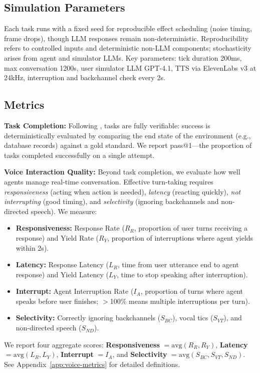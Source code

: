 \subsection{Simulation Parameters}

Each task runs with a fixed seed for reproducible effect scheduling (noise timing, frame drops), though LLM responses remain non-deterministic. Reproducibility refers to controlled inputs and deterministic non-LLM components; stochasticity arises from agent and simulator LLMs. Key parameters: tick duration 200ms, max conversation 1200s, user simulator LLM GPT-4.1, TTS via ElevenLabs v3 at 24kHz, interruption and backchannel check every 2s.

\subsection{Metrics}

\textbf{Task Completion:} Following \tautwobench{}, tasks are fully verifiable: success is deterministically evaluated by comparing the end state of the environment (e.g., database records) against a gold standard. We report pass@1---the proportion of tasks completed successfully on a single attempt.

\textbf{Voice Interaction Quality:} Beyond task completion, we evaluate how well agents manage real-time conversation. Effective turn-taking requires \textit{responsiveness} (acting when action is needed), \textit{latency} (reacting quickly), \textit{not interrupting} (good timing), and \textit{selectivity} (ignoring backchannels and non-directed speech). We measure:
\begin{itemize}[nosep,leftmargin=*]
    \item \textbf{Responsiveness:} Response Rate ($R_R$, proportion of user turns receiving a response) and Yield Rate ($R_Y$, proportion of interruptions where agent yields within 2s).
    \item \textbf{Latency:} Response Latency ($L_R$, time from user utterance end to agent response) and Yield Latency ($L_Y$, time to stop speaking after interruption).
    \item \textbf{Interrupt:} Agent Interruption Rate ($I_A$, proportion of turns where agent speaks before user finishes; $>$100\% means multiple interruptions per turn).
    \item \textbf{Selectivity:} Correctly ignoring backchannels ($S_{BC}$), vocal tics ($S_{VT}$), and non-directed speech ($S_{ND}$).
\end{itemize}
We report four aggregate scores: \textbf{Responsiveness} $= \mathrm{avg}(R_R, R_Y)$, \textbf{Latency} $= \mathrm{avg}(L_R, L_Y)$, \textbf{Interrupt} $= I_A$, and \textbf{Selectivity} $= \mathrm{avg}(S_{BC}, S_{VT}, S_{ND})$. See Appendix~\ref{app:voice-metrics} for detailed definitions.
